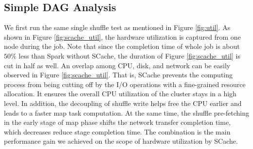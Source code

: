 \subsection{Simple DAG Analysis}
We first run the same single shuffle test as mentioned in Figure \ref{fig:util}. As shown in Figure \ref{fig:scache_util}, the hardware utilization is captured from one node during the job. Note that since the completion time of whole job is about $50\%$ less than Spark without SCache, the duration of Figure \ref{fig:scache_util} is cut in half as well. An overlap among CPU, disk, and network can be easily observed in Figure \ref{fig:scache_util}. That is, SCache prevents the computing process from being cutting off by the I/O operations with a fine-grained resource allocation. It ensures the overall CPU utilization of the cluster stays in a high level. In addition, the decoupling of shuffle write helps free the CPU earlier and leads to a faster map task computation. At the same time, the shuffle pre-fetching in the early stage of map phase shifts the network transfer completion time, which decreases reduce stage completion time. The combination is the main performance gain we achieved on the scope of hardware utilization by SCache.

